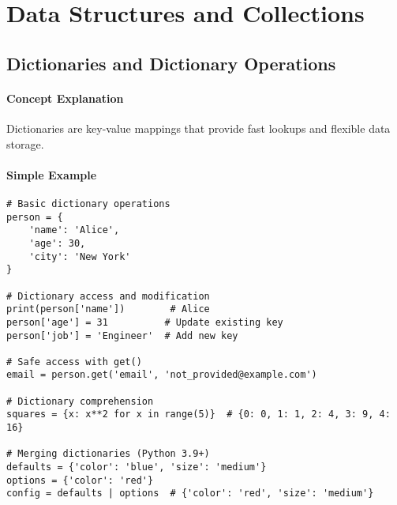 \section{Data Structures and Collections}

\subsection{Dictionaries and Dictionary Operations}

\paragraph{Concept Explanation}
Dictionaries are key-value mappings that provide fast lookups and flexible data storage.

\paragraph{Simple Example}
\begin{lstlisting}[caption=Dictionary Examples]
# Basic dictionary operations
person = {
    'name': 'Alice',
    'age': 30,
    'city': 'New York'
}

# Dictionary access and modification
print(person['name'])        # Alice
person['age'] = 31          # Update existing key
person['job'] = 'Engineer'  # Add new key

# Safe access with get()
email = person.get('email', 'not_provided@example.com')

# Dictionary comprehension
squares = {x: x**2 for x in range(5)}  # {0: 0, 1: 1, 2: 4, 3: 9, 4: 16}

# Merging dictionaries (Python 3.9+)
defaults = {'color': 'blue', 'size': 'medium'}
options = {'color': 'red'}
config = defaults | options  # {'color': 'red', 'size': 'medium'}
\end{lstlisting}

